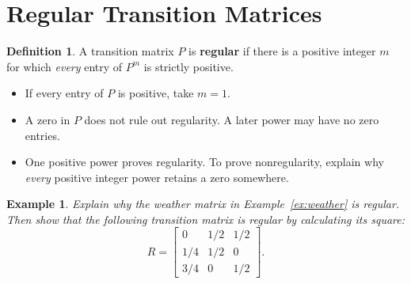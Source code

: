 \documentclass{article}
\theoremstyle{plain}
\newtheorem{example}{Example}[section]
\theoremstyle{definition}
\newtheorem{definition}{Definition}[section]
\theoremstyle{remark}
\newcommand{\work}{\par\vfill}
\begin{document}
\work

\newpage
\section{Regular Transition Matrices}
\begin{definition}
A transition matrix $P$ is \textbf{regular} if there is a positive integer $m$ for which \emph{every} entry of $P^m$ is strictly positive.
\end{definition}
\begin{itemize}
\item If every entry of $P$ is positive, take $m=1$.
\item A zero in $P$ does not rule out regularity. A later power may have no zero entries.
\item One positive power proves regularity. To prove nonregularity, explain why \emph{every} positive integer power retains a zero somewhere.
\end{itemize}
\begin{example}\label{ex:regular}
Explain why the weather matrix in Example~\ref{ex:weather} is regular. Then show that the following transition matrix is regular by calculating its square:
\[
R=\begin{bmatrix}0&1/2&1/2\\1/4&1/2&0\\3/4&0&1/2\end{bmatrix}.
\]
\end{example}

\work

\newpage
\end{document}
